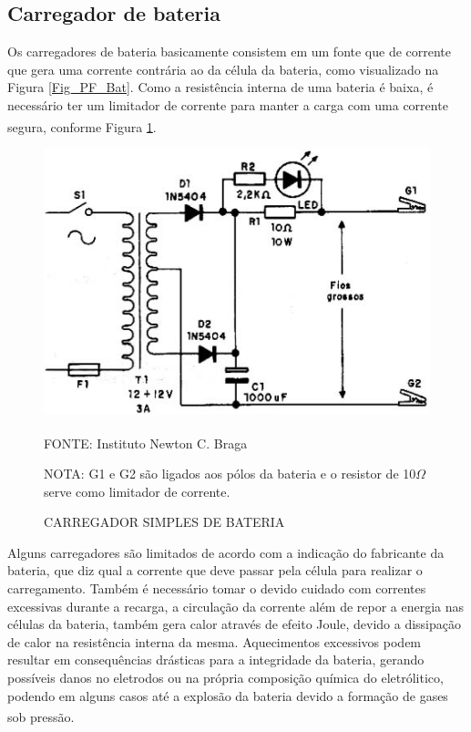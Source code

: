 \documentclass[
	12pt,				%
	openright,			%
	oneside,			%
	a4paper,			%
	english,			%
	french,				%
	spanish,			%
	brazil,				%
	oldfontcommands
	]{abntex2}
\begin{document}
\subsection[Carregador de bateria]{Carregador de bateria}

	Os carregadores de bateria basicamente consistem em um fonte que de corrente que gera uma corrente contrária ao da célula da bateria, como visualizado na Figura \ref{Fig_PF_Bat}. Como a resistência interna de uma bateria é baixa, é necessário ter um limitador de corrente para manter a carga com uma corrente segura, conforme Figura \ref{Fig_Carregador}.\textsuperscript{\cite{carregador}}
	
	\begin{figure}[th]
		\caption{CARREGADOR SIMPLES DE BATERIA}
		\label{Fig_Carregador}
		\centering
		\includegraphics[width=0.7\linewidth]{./figs/carregador}
			
		\begin{small}
			FONTE: Instituto Newton C. Braga\textsuperscript{\cite{carregador}}
		\end{small}	
		
		\begin{footnotesize}
		NOTA: G1 e G2 são ligados aos pólos da bateria e o resistor de 10$\Omega$ serve como limitador de corrente.
		\end{footnotesize}	
	\end{figure}
	
	Alguns carregadores são limitados de acordo com a indicação do fabricante da bateria, que diz qual a corrente que deve passar pela célula para realizar o carregamento. Também é necessário tomar o devido cuidado com correntes excessivas durante a recarga, a circulação da corrente além de repor a energia nas células da bateria, também gera calor através de efeito Joule, devido a dissipação de calor na resistência interna da mesma. Aquecimentos excessivos podem resultar em consequências drásticas para a integridade da bateria, gerando possíveis danos no eletrodos ou na própria composição química do eletrólitico, podendo em alguns casos até a explosão da bateria devido a formação de gases sob pressão.\textsuperscript{\cite{carregador}}
	
\end{document}
